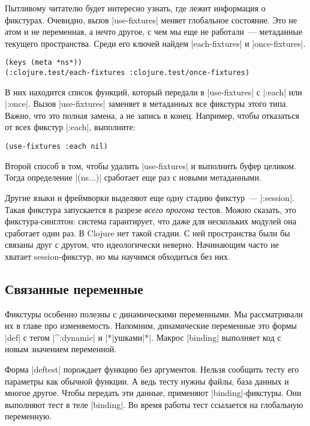 Пытливому читателю будет интересно узнать, где лежит информация о
фикстурах. Очевидно, вызов \spverb|use-fixtures| меняет глобальное
состояние. Это не атом и не переменная, а нечто другое, с чем мы еще не
работали~--- метаданные текущего пространства. Среди его ключей найдем
\spverb|each-fixtures| и \spverb|once-fixtures|.

\begin{verbatim}
(keys (meta *ns*))
(:clojure.test/each-fixtures :clojure.test/once-fixtures)
\end{verbatim}

В них находится список функций, который передали в \spverb|use-fixtures| с
\spverb|:each| или \spverb|:once|. Вызов \spverb|use-fixtures| заменяет в
метаданных все фикстуры этого типа. Важно, что это полная замена, а не запись в
конец. Например, чтобы отказаться от всех фикстур \spverb|:each|, выполните:

\begin{verbatim}
(use-fixtures :each nil)
\end{verbatim}

Второй способ в том, чтобы удалить \spverb|use-fixtures| и выполнить буфер
целиком. Тогда определение \spverb|(ns...)| сработает еще раз с новыми
метаданными.

Другие языки и фреймворки выделяют еще одну стадию фикстур~---
\spverb|:session|. Такая фикстура запускается в разрезе \emph{всего прогона}
тестов. Можно сказать, это фикстура-синглтон: система гарантирует, что даже для
нескольких модулей она сработает один раз. В Clojure нет такой стадии. С ней
пространства были бы связаны друг с другом, что идеологически
неверно. Начинающим часто не хватает session-фикстур, но мы научимся обходиться
без них.

\subsection{Связанные переменные}


Фикстуры особенно полезны с динамическими переменными. Мы рассматривали их в
главе про изменяемость. Напомним, динамические переменные это формы \spverb|def|
с тегом \spverb|^:dynamic| и \spverb|*|ушками\spverb|*|. Макрос \spverb|binding|
выполняет код с новым значением переменной.

Форма \spverb|deftest| порождает функцию без аргументов. Нельзя сообщить тесту
его параметры как обычной функции. А ведь тесту нужны файлы, база данных и
многое другое. Чтобы передать эти данные, применяют
\spverb|binding|-фикстуры. Они выполняют тест в теле \spverb|binding|. Во время
работы тест ссылается на глобальную переменную.

